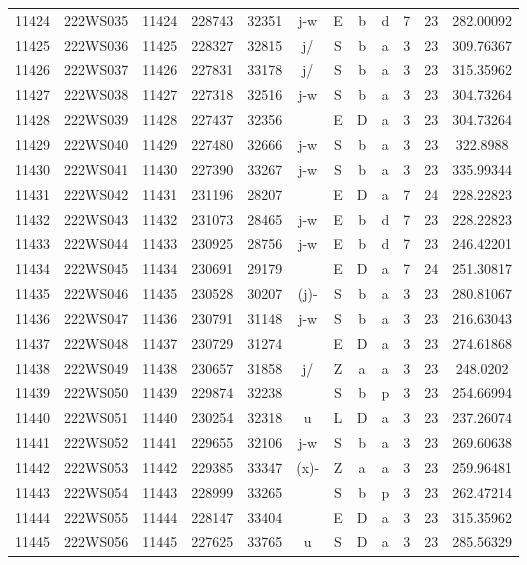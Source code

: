 \begin{tabular}{|*{12}{c|}}
11424 & 222WS035 & 11424 & 228743 & 32351 & j-w & E & b & d & 7 & 23 & 282.00092 \\ 
11425 & 222WS036 & 11425 & 228327 & 32815 & j/ & S & b & a & 3 & 23 & 309.76367 \\ 
11426 & 222WS037 & 11426 & 227831 & 33178 & j/ & S & b & a & 3 & 23 & 315.35962 \\ 
11427 & 222WS038 & 11427 & 227318 & 32516 & j-w & S & b & a & 3 & 23 & 304.73264 \\ 
11428 & 222WS039 & 11428 & 227437 & 32356 &  & E & D & a & 3 & 23 & 304.73264 \\ 
11429 & 222WS040 & 11429 & 227480 & 32666 & j-w & S & b & a & 3 & 23 & 322.8988 \\ 
11430 & 222WS041 & 11430 & 227390 & 33267 & j-w & S & b & a & 3 & 23 & 335.99344 \\ 
11431 & 222WS042 & 11431 & 231196 & 28207 &  & E & D & a & 7 & 24 & 228.22823 \\ 
11432 & 222WS043 & 11432 & 231073 & 28465 & j-w & E & b & d & 7 & 23 & 228.22823 \\ 
11433 & 222WS044 & 11433 & 230925 & 28756 & j-w & E & b & d & 7 & 23 & 246.42201 \\ 
11434 & 222WS045 & 11434 & 230691 & 29179 &  & E & D & a & 7 & 24 & 251.30817 \\ 
11435 & 222WS046 & 11435 & 230528 & 30207 & (j)- & S & b & a & 3 & 23 & 280.81067 \\ 
11436 & 222WS047 & 11436 & 230791 & 31148 & j-w & S & b & a & 3 & 23 & 216.63043 \\ 
11437 & 222WS048 & 11437 & 230729 & 31274 &  & E & D & a & 3 & 23 & 274.61868 \\ 
11438 & 222WS049 & 11438 & 230657 & 31858 & j/ & Z & a & a & 3 & 23 & 248.0202 \\ 
11439 & 222WS050 & 11439 & 229874 & 32238 &  & S & b & p & 3 & 23 & 254.66994 \\ 
11440 & 222WS051 & 11440 & 230254 & 32318 & u & L & D & a & 3 & 23 & 237.26074 \\ 
11441 & 222WS052 & 11441 & 229655 & 32106 & j-w & S & b & a & 3 & 23 & 269.60638 \\ 
11442 & 222WS053 & 11442 & 229385 & 33347 & (x)- & Z & a & a & 3 & 23 & 259.96481 \\ 
11443 & 222WS054 & 11443 & 228999 & 33265 &  & S & b & p & 3 & 23 & 262.47214 \\ 
11444 & 222WS055 & 11444 & 228147 & 33404 &  & E & D & a & 3 & 23 & 315.35962 \\ 
11445 & 222WS056 & 11445 & 227625 & 33765 & u & S & D & a & 3 & 23 & 285.56329 \\ 

\end{tabular}

